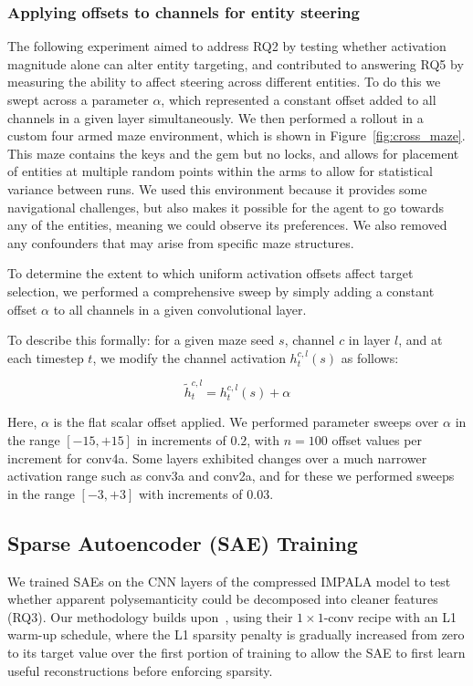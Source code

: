     \subsubsection{Applying offsets to channels for entity steering}
    The following experiment aimed to address RQ2 by testing whether activation magnitude alone can alter entity targeting, and contributed to answering RQ5 by measuring the ability to affect steering across different entities. To do this we swept across a parameter $\alpha$, which represented a constant offset added to all channels in a given layer simultaneously. We then performed a rollout in a custom four armed maze environment, which is shown in Figure~\ref{fig:cross_maze}. This maze contains the keys and the gem but no locks, and allows for placement of entities at multiple random points within the arms to allow for statistical variance between runs. We used this environment because it provides some navigational challenges, but also makes it possible for the agent to go towards any of the entities, meaning we could observe its preferences. We also removed any confounders that may arise from specific maze structures.
    
    To determine the extent to which uniform activation offsets affect target selection, we performed a comprehensive sweep by simply adding a constant offset $\alpha$ to all channels in a given convolutional layer. 

    To describe this formally: for a given maze seed $s$, channel $c$ in layer $l$, and at each timestep $t$, we modify the channel activation $h_t^{c,l}(s)$ as follows:

    \begin{equation}
    \tilde{h}_t^{c,l} = h_t^{c,l}(s) + \alpha
    \end{equation}

    Here, $\alpha$ is the flat scalar offset applied. We performed parameter sweeps over $\alpha$ in the range $[-15, +15]$ in increments of $0.2$, with $n=100$ offset values per increment for conv4a. Some layers exhibited changes over a much narrower activation range such as conv3a and conv2a, and for these we performed sweeps in the range $[-3, +3]$ with increments of $0.03$.

    \subsection{Sparse Autoencoder (SAE) Training}
    \label{subsec:sae_training}
    We trained SAEs on the CNN layers of the compressed IMPALA model to test whether apparent polysemanticity could be decomposed into cleaner features (RQ3). Our methodology builds upon~\citet{gorton_2024_missing}, using their $1\times1$-conv recipe with an L1 warm-up schedule, where the L1 sparsity penalty is gradually increased from zero to its target value over the first portion of training to allow the SAE to first learn useful reconstructions before enforcing sparsity.

